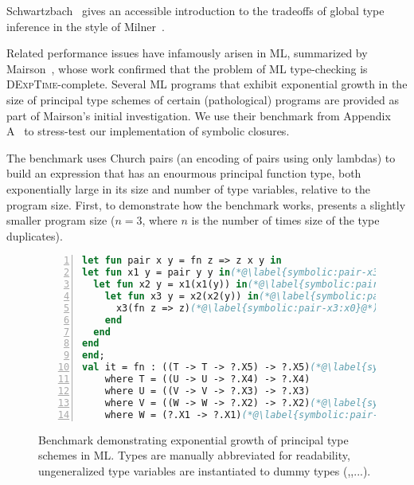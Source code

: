 Schwartzbach~\cite{schwartzbach1995polymorphic}
gives an accessible introduction to the tradeoffs of
global type inference
in the style of Milner~\cite{milner1978theory}.


Related performance issues have infamously arisen in ML, summarized
by Mairson~\cite{Mairson:1989}, whose work confirmed
that the problem of ML type-checking is \textsc{DExpTime}-complete.
Several ML programs that exhibit exponential
growth in the size of principal type schemes of certain (pathological)
programs are provided as part of Mairson's initial investigation.
We use their benchmark from Appendix A~\cite{Mairson:1989} to stress-test our implementation of symbolic closures.

The benchmark uses Church pairs (an encoding of pairs using only lambdas)
to build an expression that has an enourmous principal function type,
both exponentially large in its size and number of type variables, relative
to the program size.
First, to demonstrate how the benchmark works, 
presents a slightly smaller program size
($n=3$, where $n$ is the number of times size of the type duplicates).


\begin{figure}
\begin{lstlisting}[language=ml, numbers=left]
let fun pair x y = fn z => z x y in
let fun x1 y = pair y y in(*@\label{symbolic:pair-x3:x1}@*)
  let fun x2 y = x1(x1(y)) in(*@\label{symbolic:pair-x3:x2}@*)
    let fun x3 y = x2(x2(y)) in(*@\label{symbolic:pair-x3:x3}@*)
      x3(fn z => z)(*@\label{symbolic:pair-x3:x0}@*)
    end
  end
end
end;
val it = fn : ((T -> T -> ?.X5) -> ?.X5)(*@\label{symbolic:pair-x3:it}@*)
    where T = ((U -> U -> ?.X4) -> ?.X4)
    where U = ((V -> V -> ?.X3) -> ?.X3)
    where V = ((W -> W -> ?.X2) -> ?.X2)(*@\label{symbolic:pair-x3:X2}@*)
    where W = (?.X1 -> ?.X1)(*@\label{symbolic:pair-x3:W}@*)
\end{lstlisting}
\caption{Benchmark demonstrating exponential growth of principal type schemes in ML.
  Types are manually abbreviated for readability, ungeneralized type variables are
  instantiated to dummy types (,,...).}
\label{symbolic:figure:pair-benchmark}
\end{figure}

